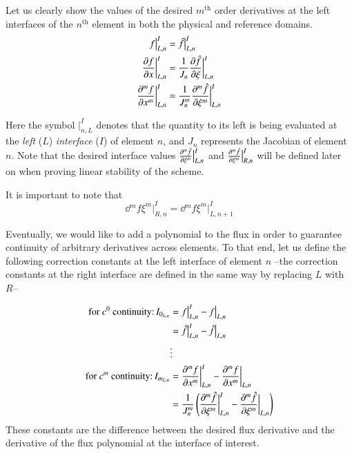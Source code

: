 Let us clearly show the values of the desired $m^{\text{th}}$ order derivatives at the left interfaces of the $n^{\text{th}}$ element in
both the physical and reference domains.
\begin{align}
f\big|^{I}_{L,n} &= {\hat{f}}\big|^{I}_{L,n} \\
{\frac{\partial f}{\partial x}} \bigg|_{L,n}^I &= \frac{1}{J_n} {\frac{\partial {\hat{f}}}{\partial \xi}}  \bigg|_{L,n}^I\\
{\frac{\partial ^m f}{\partial x^m}} \bigg|_{L,n}^I &= \frac{1}{J_n^m} {\frac{\partial ^m {\hat{f}}}{\partial \xi^m}}  \bigg|_{L,n}^I
\end{align}

Here the symbol $|^{I}_{n,L}$ denotes that the quantity to its left is being evaluated at the \emph{left} ($L$) \emph{interface} ($I$) of element $n$, and $J_n$ represents the Jacobian of element $n$. Note that the desired interface values ${\frac{\partial ^m {\hat{f}}}{\partial \xi^m}}  \big|_{L,n}^I$ and ${\frac{\partial ^m {\hat{f}}}{\partial \xi^m}}  \big|_{R,n}^I$ will be defined later on when proving linear stability of the scheme.

It is important to note that
\begin{equation}
\dd{^m f}{\xi^m}  \bigg|_{R,n}^I = \dd{^m f}{\xi^m}  \bigg|_{L,n+1}^I
\end{equation}

Eventually, we would like to add a polynomial to the flux in order to guarantee continuity of arbitrary derivatives across elements. To that end, let us define the following correction constants at the left interface of element $n$ --the correction constants at the right interface are defined in the same way by replacing $L$ with $R$--

\begin{equation} 
\begin{aligned}
 \text{for $c^0$ continuity:} \, \IL[0] &= 
f\big|^I_{L,n} - \fud\big|_{L,n}\\
&= \frd\big|^I_{L,n} - \frd\big|_{L,n}\\
 &\vdots\\
\text{for $c^m$ continuity:} \, \IL[m] &= %
\dd{^m f}{x^m} \bigg|^I_{L,n} - \dd{^m \fud}{x^m} \bigg|_{L,n}\\
&= \frac{1}{J_n^m}\l(\dd{^m \frd}{\xi^m} \bigg|^I_{L,n} - \dd{^m \frd}{\xi^m} \bigg|_{L,n}\r)
\end{aligned}
\label{eq:jump_def}
\end{equation}
These constants are the difference between the desired flux derivative and the derivative of the flux polynomial at the interface of interest.

